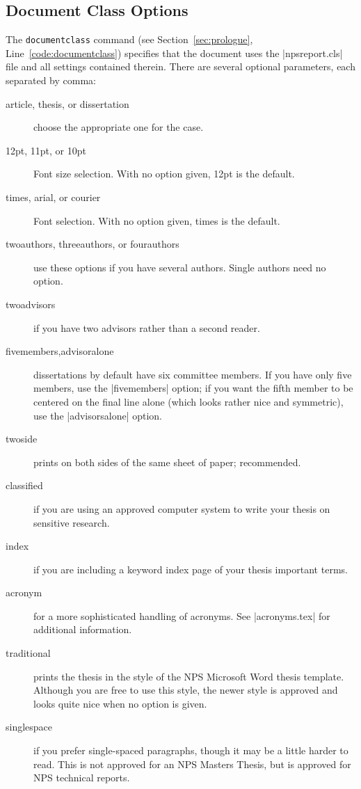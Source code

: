 \subsection{Document Class Options}\label{sec:documentclass}
The \verb|documentclass| command (see Section~\ref{sec:prologue}, Line~\ref{code:documentclass}) 
specifies that the document uses the |npsreport.cls|
  file and all settings contained therein.  There are  several optional
  parameters, each separated by comma: 
  \begin{description}
    \item[article, thesis, or dissertation] choose the appropriate one 
    for the case.
    \item[12pt, 11pt, or 10pt] Font size selection.  With no option given, 12pt is the default.
    \item[times, arial, or courier]  Font selection.  With no option given, times is the default.
    \item[twoauthors, threeauthors, or fourauthors] use these options if you have 
    several authors.  Single authors need no option. 
    \item[twoadvisors] if you have two advisors rather than a second reader. 
    \item[fivemembers,advisoralone] dissertations by default have six committee members. 
    If you have only five members, use the |fivemembers| option; if you want the fifth member
    to be centered on the final line alone (which looks rather nice and symmetric), use the |advisorsalone| option.
    \item[twoside] prints on both sides of the same sheet of paper; recommended.
    \item[classified] if you are using an approved computer system to 
    write your thesis on sensitive research.
    \item[index] if you are including a keyword index page of your 
    thesis important terms.
    \item[acronym] for a more sophisticated handling of acronyms.  See 
    |acronyms.tex| for additional information.
    \item[traditional] prints the thesis in the style of the NPS
      Microsoft Word thesis template. Although you are free to use
      this style, the newer style is approved and looks quite nice 
    when no option is given.
    \item[singlespace] if you prefer single-spaced paragraphs, though it 
    may be a little harder to read. This is not approved for an NPS
    Masters Thesis, but is approved for NPS technical reports.
  \end{description}

